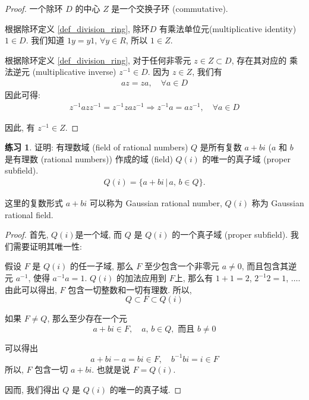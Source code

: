 \documentclass[utf8]{ctexbook}
\theoremstyle{definition}
\newtheorem{exercise}{练习}[section]
\begin{document}
\begin{proof}
一个除环 $D$ 的中心 $Z$ 是一个交换子环 (commutative). 

根据除环定义 \ref{def_division_ring}, 除环$D$ 有乘法单位元(multiplicative identity) $ 1 \in D$. 我们知道 $1 y = y 1$, $\forall y \in R$, 所以 $1 \in Z$.

根据除环定义 \ref{def_division_ring}, 对于任何非零元 $z \in Z \subset D$, 存在其对应的 乘法逆元 (multiplicative inverse) $z^{-1} \in D$. 因为 $z \in Z$, 我们有
\begin{align*}
az = za, \quad \forall a \in D
\end{align*}
因此可得:
\begin{align*}
z^{-1} az z^{-1} = z^{-1} za z^{-1}  \Rightarrow z^{-1} a = a  z^{-1} , \quad \forall a \in D
\end{align*}

因此, 有 $z^{-1} \in Z$.

\end{proof}


\begin{exercise}
证明: 有理数域 (field of rational numbers) $Q$ 是所有复数 $a + bi$ ($a$ 和 $b$ 是有理数 (rational numbers)) 作成的域 (field) $Q(i)$ 的唯一的真子域 (proper subfield).
\begin{align*}
Q(i) = \{ a + bi \, |\,  a, \, b \in Q \} .
\end{align*}

这里的复数形式 $a + bi$ 可以称为 Gaussian rational number, $Q(i)$ 称为 Gaussian rational field.

\end{exercise}

\begin{proof}
首先, $Q(i)$是一个域, 而 $Q$ 是 $Q(i)$ 的一个真子域 (proper subfield). 我们需要证明其唯一性:

假设 $F$ 是 $Q(i)$ 的任一子域, 那么 $F$ 至少包含一个非零元 $a \neq 0$, 而且包含其逆元 $a^{-1}$, 使得 $a^{-1} a = 1$. $Q(i)$ 的加法应用到 $F$上, 那么有 $1+1=2$, $2^{-1} 2 = 1$,
$\ldots$. 由此可以得出, $F$ 包含一切整数和一切有理数. 所以,
\begin{equation}
Q \subset F \subset Q(i)
\end{equation}

如果 $F \neq Q$, 那么至少存在一个元
\begin{equation}
a + bi \in F, \quad a, \, b \in Q, \mbox{  而且  }  b \neq 0
\end{equation}

可以得出
\begin{equation}
a + bi - a  = bi \in F, \quad b^{-1} b i = i \in F
\end{equation}
所以, $F$ 包含一切 $a+ bi$. 也就是说 $F = Q(i)$.

因而, 我们得出 $Q$ 是 $Q(i)$ 的唯一的真子域.

\end{proof}
\end{document}

